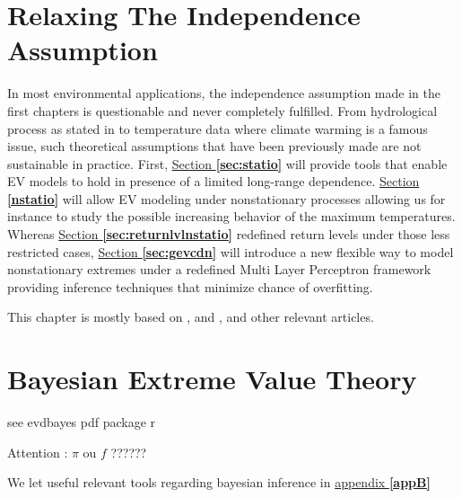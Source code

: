 \documentclass[11pt,a4paper,openany, twosided]{book}
\begin{document}
\newpage




\chapter{Relaxing The Independence Assumption}\label{sec::3}
\vspace{-1cm}
\minitoc\thispagestyle{empty}
 \vspace{1cm}
 
In most environmental applications, the independence assumption made in the first chapters is questionable and never completely fulfilled. From hydrological process as stated in \citet{milly_climate_2008} to temperature data where climate warming is a famous issue, such theoretical assumptions that have been previously made are not sustainable in practice. First, 
\hyperref[sec:statio]{Section \textbf{\ref{sec:statio}}} will provide tools that enable EV models to hold in presence of a limited long-range dependence.
\hyperref[nstatio]{Section \textbf{\ref{nstatio}}} will allow EV modeling under nonstationary processes allowing us for instance to study the possible increasing behavior of the maximum temperatures. Whereas \hyperref[sec:returnlvlnstatio]{Section \textbf{\ref{sec:returnlvlnstatio}}} redefined return levels under those less restricted cases,   \hyperref[sec:gevcdn]{Section \textbf{\ref{sec:gevcdn}}} will introduce a new flexible way to model nonstationary extremes under a redefined Multi Layer Perceptron framework providing inference techniques that minimize chance of overfitting.


This chapter is mostly based on \citet[chap.5-6]{coles_introduction_2001}, \citet[chap.10]{beirlant_statistics_2006} and \citet[chap.7]{reiss_statistical_2007}, and other relevant articles.
\newpage





\chapter{Bayesian Extreme Value Theory}\label{sec::bayesian}
\vspace{-1cm}
\minitoc\thispagestyle{empty}
 \vspace{1cm}
 
see evdbayes pdf package r

Attention : $\pi$ ou $f$ ?????? 

We let useful relevant tools regarding bayesian inference in \hyperref[bayesapp]{appendix \textbf{\ref{appB}}}
\end{document}
